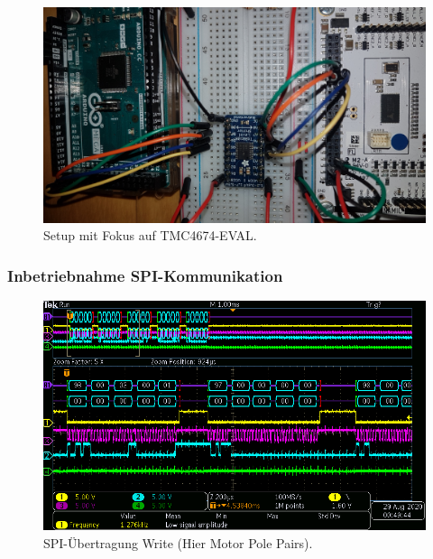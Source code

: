 \begin{figure}[H]
	\centering
	\includegraphics[angle=180,width=\textwidth]{graphics/1_EVAL}
	\caption{Setup mit Fokus auf TMC4674-EVAL.}
	\label{fig:1_EVAL}
\end{figure}

\subsubsection{Inbetriebnahme SPI-Kommunikation}\label{Appendix:TMC4671_SPI}

\begin{figure}[H]
\center
\includegraphics[width = \textwidth]{graphics/TMC4671_Beschreiben_1}
\caption{SPI-Übertragung Write (Hier Motor Pole Pairs).}
\label{fig:TMC4671_Lesen_1}
\end{figure}

